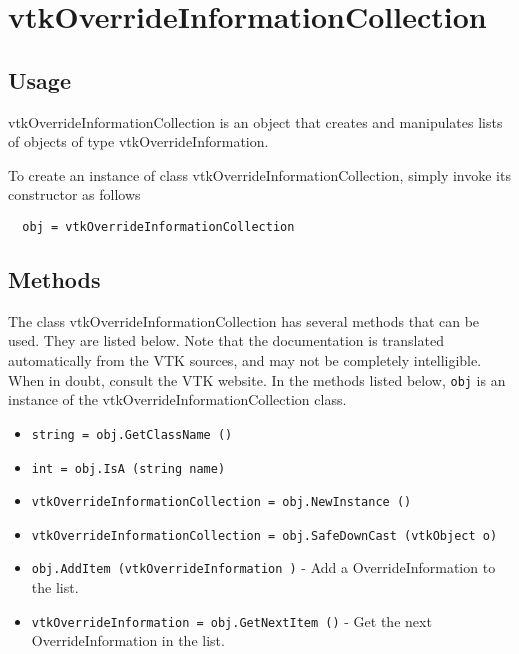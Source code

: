 \section{vtkOverrideInformationCollection}

\subsection{Usage}

 vtkOverrideInformationCollection is an object that creates and manipulates
 lists of objects of type vtkOverrideInformation. 

To create an instance of class vtkOverrideInformationCollection, simply
invoke its constructor as follows
\begin{verbatim}
  obj = vtkOverrideInformationCollection
\end{verbatim}
\subsection{Methods}

The class vtkOverrideInformationCollection has several methods that can be used.
  They are listed below.
Note that the documentation is translated automatically from the VTK sources,
and may not be completely intelligible.  When in doubt, consult the VTK website.
In the methods listed below, \verb|obj| is an instance of the vtkOverrideInformationCollection class.
\begin{itemize}
\item  \verb|string = obj.GetClassName ()|

\item  \verb|int = obj.IsA (string name)|

\item  \verb|vtkOverrideInformationCollection = obj.NewInstance ()|

\item  \verb|vtkOverrideInformationCollection = obj.SafeDownCast (vtkObject o)|

\item  \verb|obj.AddItem (vtkOverrideInformation )| -  Add a OverrideInformation to the list.

\item  \verb|vtkOverrideInformation = obj.GetNextItem ()| -  Get the next OverrideInformation in the list.

\end{itemize}

